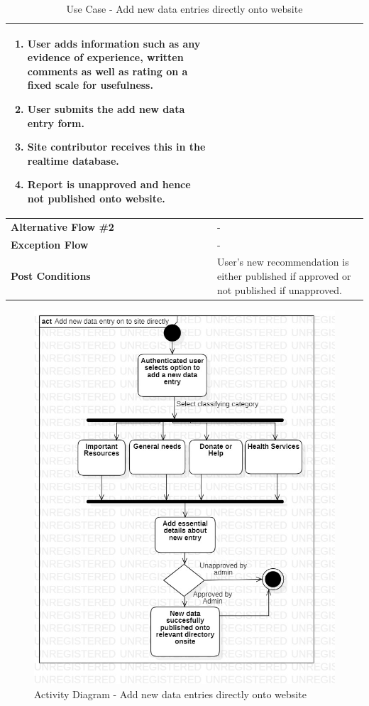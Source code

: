 \begin{table}[H]
{\begin{tabular}{|p{.3\linewidth}|p{.7\linewidth}|}
\begin{minipage}[H]{\linewidth}
\begin{enumerate}[label=\textbf{Step \arabic*:},leftmargin=1.5\leftmargin]
            \item User adds information such as any evidence of experience, written comments as well as rating on a fixed scale for usefulness.
            \item User submits the add new data entry form.
            \item Site contributor receives this in the realtime database.
            \item Report is unapproved and hence not published onto website.
          \end{enumerate}
        \end{minipage} \\
      \hline
      \textbf{Alternative Flow \#2} & - \\
      \hline
      \textbf{Exception Flow} & - \\
      \hline
      \textbf{Post Conditions} & User's new recommendation is either published if approved or not published if unapproved. \\
      \hline
    \end{tabular}
  }
  \caption{Use Case - Add new data entries directly onto website}
\end{table}

\begin{figure}[H]
  \centering
  \includegraphics[width=\linewidth]{img/activity-diagram-s4-add-new-data.jpg}
  \caption{Activity Diagram - Add new data entries directly onto website}
\end{figure}

